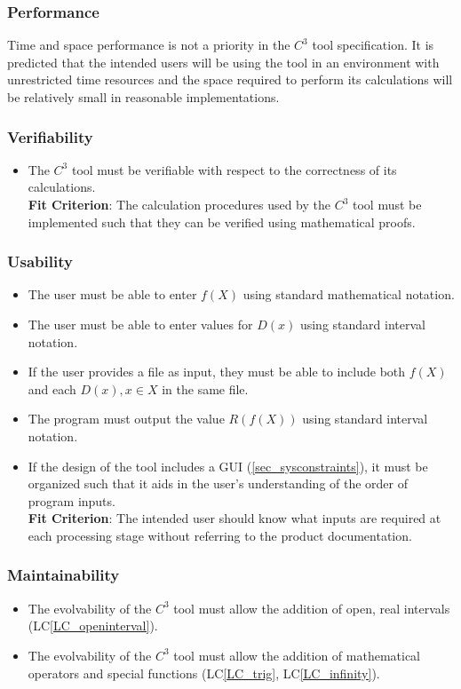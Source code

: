 \documentclass[12pt]{article}
\newcommand{\lcref}[1]{LC\ref{#1}}
\newcommand{\prognameAbbrv}{$C^{3}$}
\begin{document}
\subsubsection*{Performance}
Time and space performance is not a priority in the \prognameAbbrv{} tool 
specification. It is predicted that the intended users will be using the tool 
in an environment with unrestricted time resources and the space required to 
perform its calculations will be relatively small in reasonable implementations.

\subsubsection*{Verifiability}
\begin{itemize}
	\item The \prognameAbbrv{} tool must be verifiable with respect to the 
	correctness of its calculations.\\ \textbf{Fit Criterion}: The calculation 
	procedures used by the \prognameAbbrv{} tool must be implemented such that 
	they can be verified using mathematical proofs.
\end{itemize}

\subsubsection*{Usability}
\begin{itemize}
	\item The user must be able to enter $f(X)$ using standard mathematical 
	notation.
	\item The user must be able to enter values for $D(x)$ using standard 
	interval notation.
	\item If the user provides a file as input, they must be able to include 
	both $f(X)$ and each $D(x), x \in X$ in the same file.
	\item The program must output the value $R(f(X))$ using standard interval 
	notation.
	\item If the design of the tool includes a GUI (\ref{sec_sysconstraints}), 
	it must be organized such that it aids in the user's understanding of the 
	order of program inputs.\\\textbf{Fit Criterion}: The intended user should 
	know what inputs are required at each processing stage without referring to 
	the product documentation.
\end{itemize}

\subsubsection*{Maintainability}
\begin{itemize}
	\item The evolvability of the \prognameAbbrv{} tool must allow the addition 
	of open, real intervals (\lcref{LC_openinterval}).
	\item The evolvability of the \prognameAbbrv{} tool must allow the addition 
	of mathematical operators and special functions (\lcref{LC_trig}, 
	\lcref{LC_infinity}).
\end{itemize}
\end{document}
